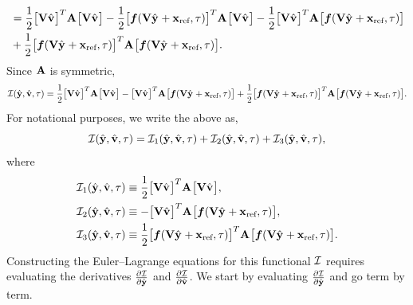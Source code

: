 \documentclass[3p,computermodern,10pt]{elsarticle}
\begin{document}
\begin{appendices}
\begin{align*}
 &= \frac{1}{2}\big[\mathbf {V} \hat{\mathbf{v}}^{}  \big]^T  \mathbf{A}^{}  \big[\mathbf {V} \hat{\mathbf{v}}^{} \big]  - \frac{1}{2}\big[ \boldsymbol f(\mathbf {V} \hat{\mathbf{y}}^{} + \mathbf{x}_\text{ref},\tau) \big]^T \mathbf{A}^{}  \big[\mathbf {V} \hat{\mathbf{v}}^{}\big] - \frac{1}{2} \big[ \mathbf {V} \hat{\mathbf{v}}^{} \big]^T \mathbf{A}^{} \big[ \boldsymbol f(\mathbf {V} \hat{\mathbf{y}}^{} + \mathbf{x}_\text{ref},\tau) \big]  \\ &+ \frac{1}{2}\big[\boldsymbol f(\mathbf {V} \hat{\mathbf{y}}^{} + \mathbf{x}_\text{ref},\tau) \big]^T \mathbf{A}^{} \big[ \boldsymbol f(\mathbf {V} \hat{\mathbf{y}}^{} + \mathbf{x}_\text{ref},\tau) \big].
\end{align*}
Since $\mathbf{A}$ is symmetric,
\begin{equation}\label{eq:int_expand}
 \mathcal{I}(\hat{\mathbf{y}},\hat{\mathbf{v}},\tau)  = \frac{1}{2}\big[\mathbf {V} \hat{\mathbf{v}}^{}  \big]^T  \mathbf{A}^{}  \big[ \mathbf {V} \hat{\mathbf{v}}^{} \big]  -  \big[ \mathbf {V} \hat{\mathbf{v}}^{} \big]^T \mathbf{A}^{} \big[ \boldsymbol f(\mathbf {V} \hat{\mathbf{y}}^{} + \mathbf{x}_\text{ref},\tau) \big]  + \frac{1}{2}\big[\boldsymbol f(\mathbf {V} \hat{\mathbf{y}}^{} + \mathbf{x}_\text{ref},\tau) \big]^T \mathbf{A}^{} \big[ \boldsymbol f(\mathbf {V} \hat{\mathbf{y}}^{} + \mathbf{x}_\text{ref},\tau) \big].
\end{equation}
For notational purposes, we write the above as,
$$  \mathcal{I}(\hat{\mathbf{y}},\hat{\mathbf{v}},\tau) =  \mathcal{I}_1(\hat{\mathbf{y}},\hat{\mathbf{v}},\tau) +  \mathcal{I}_2(\hat{\mathbf{y}},\hat{\mathbf{v}},\tau) +  \mathcal{I}_3(\hat{\mathbf{y}},\hat{\mathbf{v}},\tau),$$
where
\begin{align*}
&\mathcal{I}_1(\hat{\mathbf{y}},\hat{\mathbf{v}},\tau) \equiv  \frac{1}{2}\big[\mathbf {V} \hat{\mathbf{v}}^{}  \big]^T  \mathbf{A}^{}  \big[ \mathbf {V} \hat{\mathbf{v}}^{} \big], \\
&   \mathcal{I}_2(\hat{\mathbf{y}},\hat{\mathbf{v}},\tau) \equiv   -  \big[ \mathbf {V} \hat{\mathbf{v}}^{} \big]^T \mathbf{A}^{} \big[ \boldsymbol f(\mathbf {V} \hat{\mathbf{y}}^{} + \mathbf{x}_\text{ref},\tau) \big], \\
&  \mathcal{I}_3(\hat{\mathbf{y}},\hat{\mathbf{v}},\tau) \equiv  \frac{1}{2}\big[\boldsymbol f(\mathbf {V} \hat{\mathbf{y}}^{} + \mathbf{x}_\text{ref},\tau) \big]^T \mathbf{A}^{} \big[ \boldsymbol f(\mathbf {V} \hat{\mathbf{y}}^{} + \mathbf{x}_\text{ref},\tau) \big] . 
\end{align*}
Constructing the Euler--Lagrange equations for this functional $\mathcal{I}$ requires evaluating the derivatives $\frac{\partial \mathcal{I}}{\partial \hat{\mathbf{y}}}$ and $\frac{\partial \mathcal{I}}{\partial \hat{\mathbf{v}}}$. We start by evaluating $\frac{\partial \mathcal{I}}{\partial \hat{\mathbf{y}}}$ and go term by term.


\end{appendices}
\end{document}
